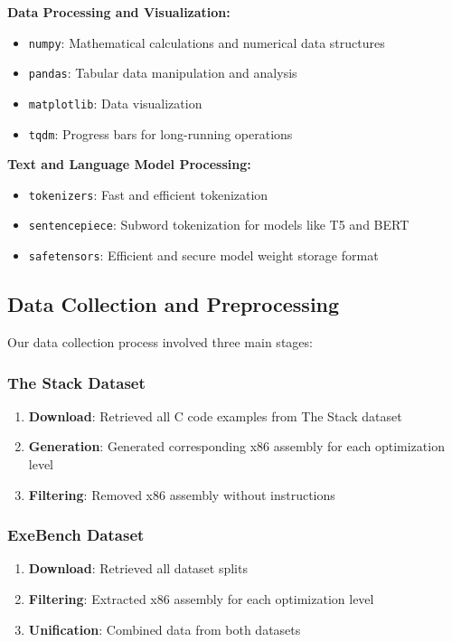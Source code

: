 \documentclass[../main.tex]{subfiles}
\begin{document}
\textbf{Data Processing and Visualization:}
\begin{itemize}
\item \texttt{numpy}: Mathematical calculations and numerical data structures
\item \texttt{pandas}: Tabular data manipulation and analysis
\item \texttt{matplotlib}: Data visualization
\item \texttt{tqdm}: Progress bars for long-running operations
\end{itemize}

\textbf{Text and Language Model Processing:}
\begin{itemize}
\item \texttt{tokenizers}: Fast and efficient tokenization
\item \texttt{sentencepiece}: Subword tokenization for models like T5 and BERT
\item \texttt{safetensors}: Efficient and secure model weight storage format
\end{itemize}

\subsection{Data Collection and Preprocessing}

Our data collection process involved three main stages:

\subsubsection{The Stack Dataset}
\begin{enumerate}
\item \textbf{Download}: Retrieved all C code examples from The Stack dataset
\item \textbf{Generation}: Generated corresponding x86 assembly for each optimization level
\item \textbf{Filtering}: Removed x86 assembly without instructions
\end{enumerate}

\subsubsection{ExeBench Dataset}
\begin{enumerate}
\item \textbf{Download}: Retrieved all dataset splits
\item \textbf{Filtering}: Extracted x86 assembly for each optimization level
\item \textbf{Unification}: Combined data from both datasets
\end{enumerate}
\end{document}
